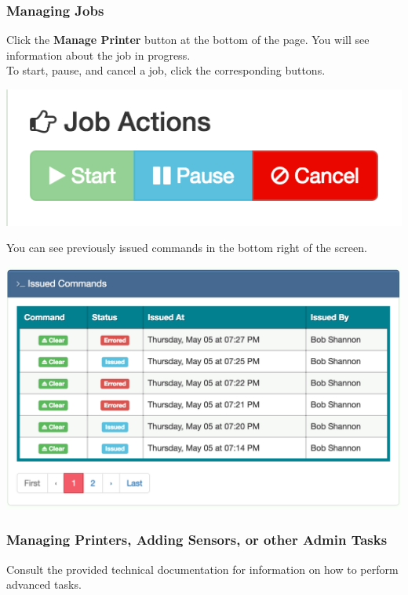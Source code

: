   \subsubsection{Managing Jobs}
      Click the \textbf{Manage Printer} button at the bottom of the page.  You will see information about the job in progress.\\
      To start, pause, and cancel a job, click the corresponding buttons. 
      \begin{center}
      \includegraphics[scale=.8]{images/job-buttons.png}
    \end{center}
You can see previously issued commands in the bottom right of the screen.
      \begin{center}
      \includegraphics[scale=.3]{images/issued-commands.png}
    \end{center}

  \subsubsection{Managing Printers, Adding Sensors, or other Admin Tasks}
      Consult the provided technical documentation for information on how to perform advanced tasks.

